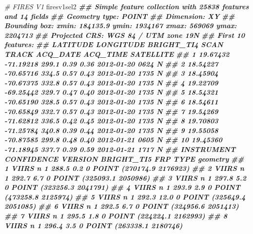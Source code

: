 \documentclass[10pt,landscape,a3paper]{article}
\newenvironment{Shaded}{\begin{snugshade}}{\end{snugshade}}
\newcommand{\CommentTok}[1]{\textcolor[rgb]{0.56,0.35,0.01}{\textit{#1}}}
\newcommand{\DocumentationTok}[1]{\textcolor[rgb]{0.56,0.35,0.01}{\textbf{\textit{#1}}}}
\newcommand{\NormalTok}[1]{#1}
\begin{document}
\begin{Shaded}
\begin{Highlighting}[]

\CommentTok{\# FIRES V1}
\NormalTok{firesv1sel2}
\DocumentationTok{\#\# Simple feature collection with 25838 features and 14 fields}
\DocumentationTok{\#\# Geometry type: POINT}
\DocumentationTok{\#\# Dimension:     XY}
\DocumentationTok{\#\# Bounding box:  xmin: 184135.9 ymin: 1934167 xmax: 569069 ymax: 2204713}
\DocumentationTok{\#\# Projected CRS: WGS 84 / UTM zone 19N}
\DocumentationTok{\#\# First 10 features:}
\DocumentationTok{\#\#    LATITUDE LONGITUDE BRIGHT\_TI4 SCAN TRACK   ACQ\_DATE ACQ\_TIME SATELLITE}
\DocumentationTok{\#\# 1  19.67432 {-}71.19218      299.1 0.39  0.36 2012{-}01{-}20     0624         N}
\DocumentationTok{\#\# 2  18.54227 {-}70.65716      334.5 0.57  0.43 2012{-}01{-}20     1735         N}
\DocumentationTok{\#\# 3  18.45904 {-}70.67375      332.8 0.57  0.43 2012{-}01{-}20     1735         N}
\DocumentationTok{\#\# 4  19.22709 {-}69.25442      329.7 0.47  0.40 2012{-}01{-}20     1735         N}
\DocumentationTok{\#\# 5  18.54321 {-}70.65190      328.5 0.57  0.43 2012{-}01{-}20     1735         N}
\DocumentationTok{\#\# 6  18.54611 {-}70.65849      332.7 0.57  0.43 2012{-}01{-}20     1735         N}
\DocumentationTok{\#\# 7  19.54269 {-}71.62812      336.5 0.42  0.45 2012{-}01{-}20     1735         N}
\DocumentationTok{\#\# 8  19.70803 {-}71.25784      340.8 0.39  0.44 2012{-}01{-}20     1735         N}
\DocumentationTok{\#\# 9  19.55058 {-}70.87585      299.8 0.48  0.40 2012{-}01{-}21     0605         N}
\DocumentationTok{\#\# 10 19.45360 {-}71.18945      337.7 0.39  0.59 2012{-}01{-}21     1717         N}
\DocumentationTok{\#\#    INSTRUMENT CONFIDENCE VERSION BRIGHT\_TI5  FRP TYPE                 geometry}
\DocumentationTok{\#\# 1       VIIRS          n       1      288.5  0.2    0 POINT (270174.9 2176923)}
\DocumentationTok{\#\# 2       VIIRS          n       1      292.7  6.7    0 POINT (325093.1 2050986)}
\DocumentationTok{\#\# 3       VIIRS          n       1      297.8  5.2    0 POINT (323256.3 2041791)}
\DocumentationTok{\#\# 4       VIIRS          n       1      293.9  2.9    0 POINT (473258.8 2125974)}
\DocumentationTok{\#\# 5       VIIRS          n       1      292.3 12.0    0 POINT (325649.4 2051085)}
\DocumentationTok{\#\# 6       VIIRS          n       1      292.5  6.7    0 POINT (324956.6 2051413)}
\DocumentationTok{\#\# 7       VIIRS          n       1      295.5  1.8    0 POINT (224224.1 2162993)}
\DocumentationTok{\#\# 8       VIIRS          n       1      296.4  3.5    0 POINT (263338.1 2180746)}

\end{Highlighting}
\end{Shaded}
\end{document}
